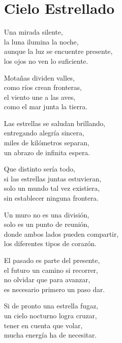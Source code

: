 \section*{Cielo Estrellado}
\label{CieloEstrellado}

\vspace{1em}
\begin{center}
Una mirada silente,\\ 
la luna ilumina la noche,\\ 
aunque la luz se encuentre presente,\\ 
los ojos no ven lo suficiente.

\vspace{1em} 
Motañas dividen valles,\\ 
como ríos crean fronteras,\\ 
el viento une a las aves,\\ 
como el mar junta la tierra.

\vspace{1em} 
Las estrellas se saludan brillando,\\ 
entregando alegría sincera,\\ 
miles de kilómetros separan,\\ 
un abrazo de infinita espera.

\vspace{1em} 
Que distinto sería todo,\\ 
si las estrellas juntas estuvieran,\\ 
solo un mundo tal vez existiera,\\ 
sin establecer ninguna frontera.

\vspace{1em} 
Un muro no es una división,\\ 
solo es un punto de reunión,\\ 
donde ambos lados pueden compartir,\\ 
los diferentes tipos de corazón.

\vspace{1em} 
El pasado es parte del presente,\\ 
el futuro un camino si recorrer,\\ 
no olvidar que para avanzar,\\ 
es necesario primero un paso dar.

\vspace{1em} 
Si de pronto una estrella fugaz,\\ 
un cielo nocturno logra cruzar,\\ 
tener en cuenta que volar,\\ 
mucha energía ha de necesitar.


\end{center}
